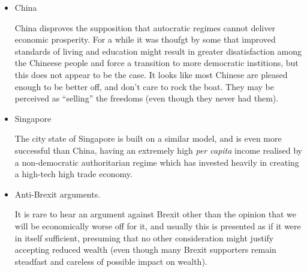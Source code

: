 \documentclass[14pt,titlepage]{extarticle}
\begin{document}
\begin{itemize}
\item China

  China disproves the supposition that autocratic regimes cannot deliver economic prosperity.
  For a while it was thoufgt by some that improved standards of living and education might result in greater disatisfaction among the Chineese people and force a transition to more democratic institions, but this does not appear to be the case.
  It looks like most Chinese are pleased enough to be better off, and don't care to rock the boat.
  They may be perceived as ``selling'' the freedoms (even though they never had them).
  
\item Singapore

  The city state of Singapore is built on a similar model, and is even more successful than China, having an extremely high \emph{per capita} income realised by a non-democratic authoritarian regime which has invested heavily in creating a high-tech high trade economy.
  
\item Anti-Brexit arguments.

  It is rare to hear an argument against Brexit other than the opinion that we will be economically worse off for it, and usually this is presented as if it were in itself sufficient, presuming that no other consideration might justify accepting reduced wealth (even though many Brexit supporters remain steadfast and careless of possible impact on wealth).
  
\end{itemize}



%
%






\end{document}
